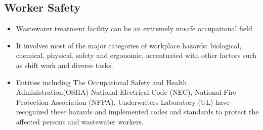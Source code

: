 \subsection{Worker Safety}
\begin{itemize}
\item Wastewater treatment facility can be an extremely unsafe occupational field
\item It involves most of the major categories of workplace hazards:  biological, chemical, physical, safety and ergonomic,  accentuated with other factors such as shift work and diverse tasks.
\item Entities including The Occupational Safety and Health Administration(OSHA) National Electrical Code (NEC), National Fire Protection Association (NFPA), Underwriters Laboratory (UL) have recognized these hazards and implemented codes and standards to protect the affected persons and wastewater workers.
\end{itemize}
